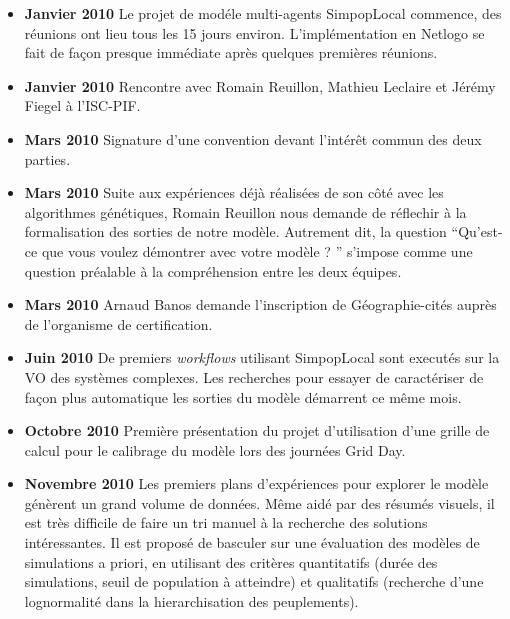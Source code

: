 \begin{itemize}[label=\textbullet]

\item {\textbf{Janvier 2010}} Le projet de modéle multi-agents SimpopLocal commence, des réunions ont lieu tous les 15 jours environ. L'implémentation en Netlogo se fait de façon presque immédiate après quelques premières réunions.

\item {\textbf{Janvier 2010}} Rencontre avec Romain Reuillon, Mathieu Leclaire et Jérémy Fiegel à l'ISC-PIF.

\item {\textbf{Mars 2010}} Signature d'une convention devant l'intérêt commun des deux parties.

\item {\textbf{Mars 2010}} Suite aux expériences déjà réalisées de son côté avec les algorithmes génétiques, Romain Reuillon nous demande de réflechir à la formalisation des sorties de notre modèle. Autrement dit, la question \enquote{Qu'est-ce que vous voulez démontrer avec votre modèle ? } s'impose comme une question préalable à la compréhension entre les deux équipes.

\item {\textbf{Mars 2010}} Arnaud Banos demande l'inscription de Géographie-cités auprès de l'organisme de certification.

\item {\textbf{Juin 2010}} De premiers \textit{workflows} utilisant SimpopLocal sont executés sur la VO des systèmes complexes. Les recherches pour essayer de caractériser de façon plus automatique les sorties du modèle démarrent ce même mois.

\item {\textbf{Octobre 2010}} Première présentation du projet d'utilisation d'une grille de calcul pour le calibrage du modèle lors des journées Grid Day.

\item {\textbf{Novembre 2010}} Les premiers plans d'expériences pour explorer le modèle génèrent un grand volume de données. Même aidé par des résumés visuels, il est très difficile de faire un tri manuel à la recherche des solutions intéressantes. Il est proposé de basculer sur une évaluation des modèles de simulations a priori, en utilisant des critères quantitatifs (durée des simulations, seuil de population à atteindre) et qualitatifs (recherche d'une lognormalité dans la hierarchisation des peuplements).


\end{itemize}
